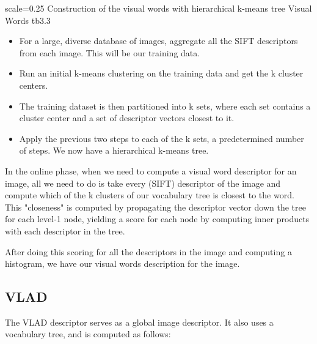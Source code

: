 {scale=0.25}%
{Construction of the visual words with hierarchical k-means tree}%
{Visual Words}%
{tb3.3} %

\begin{itemize}
	\item For a large, diverse database of images, aggregate all the SIFT descriptors from each image. This will be our training data.\\
	\item Run an initial k-means clustering on the training data and get the k cluster centers.\\
	\item The training dataset is then partitioned into k sets, where each set contains a cluster center and a set of descriptor vectors closest to it.\\
	\item Apply the previous two steps to each of the k sets, a predetermined number of steps. We now have a hierarchical k-means tree.\\
\end{itemize}

In the online phase, when we need to compute a visual word descriptor for an image, all we need to do is take every (SIFT) descriptor of the image and compute 
which of the k clusters of our vocabulary tree is closest to the word. This "closeness" is computed by propagating the descriptor vector down the tree for each 
level-1 node, yielding a score for each node by computing inner products with each descriptor in the tree.

After doing this scoring for all the descriptors in the image and computing a histogram, we have our visual words description for the image. 

\subsection{VLAD}
The VLAD descriptor serves as a global image descriptor. It also uses a vocabulary tree, and is computed as follows:

